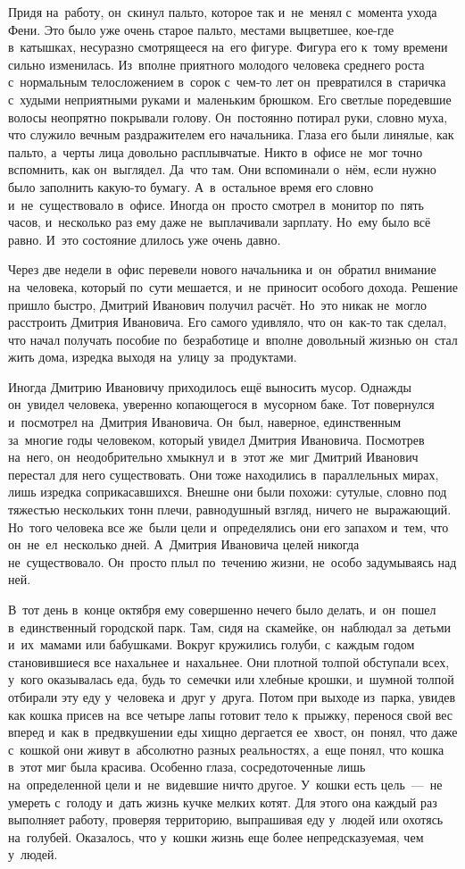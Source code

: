 Придя на~работу, он~скинул пальто, которое так и~не~менял с~момента ухода Фени.
Это было уже очень старое пальто, местами выцветшее, кое-где в~катышках, несуразно смотрящееся на~его фигуре.
Фигура его к~тому времени сильно изменилась.
Из~вполне приятного молодого человека среднего роста с~нормальным телосложением в~сорок с~чем-то лет он~превратился в~старичка с~худыми неприятными руками и~маленьким брюшком.
Его светлые поредевшие волосы неопрятно покрывали голову.
Он~постоянно потирал руки, словно муха, что служило вечным раздражителем его начальника.
Глаза его были линялые, как пальто, а~черты лица довольно расплывчатые.
Никто в~офисе не~мог точно вспомнить, как он~выглядел.
Да~что там.
Они вспоминали о~нём, если нужно было заполнить какую-то бумагу.
А~в~остальное время его словно и~не~существовало в~офисе.
Иногда он~просто смотрел в~монитор по~пять часов, и~несколько раз ему даже не~выплачивали зарплату.
Но~ему было всё равно.
И~это состояние длилось уже очень давно.
 
Через две недели в~офис перевели нового начальника и~он~обратил внимание на~человека, который по~сути мешается, и~не~приносит особого дохода.
Решение пришло быстро, Дмитрий Иванович получил расчёт.
Но~это никак не~могло расстроить Дмитрия Ивановича.
Его самого удивляло, что он~как-то так сделал, что начал получать пособие по~безработице и~вполне довольный жизнью он~стал жить дома, изредка выходя на~улицу за~продуктами.
 
Иногда Дмитрию Ивановичу приходилось ещё выносить мусор.
Однажды он~увидел человека, уверенно копающегося в~мусорном баке.
Тот повернулся и~посмотрел на~Дмитрия Ивановича.
Он~был, наверное, единственным за~многие годы человеком, который увидел Дмитрия Ивановича.
Посмотрев на~него, он~неодобрительно хмыкнул и~в~этот же~миг Дмитрий Иванович перестал для него существовать.
Они тоже находились в~параллельных мирах, лишь изредка соприкасавшихся.
Внешне они были похожи: сутулые, словно под тяжестью нескольких тонн плечи, равнодушный взгляд, ничего не~выражающий.
Но~того человека все же~были цели и~определялись они его запахом и~тем, что он~не~ел~несколько дней.
А~Дмитрия Ивановича целей никогда не~существовало.
Он~просто плыл по~течению жизни, не~особо задумываясь над ней.
 
В~тот день в~конце октября ему совершенно нечего было делать, и~он~пошел в~единственный городской парк.
Там, сидя на~скамейке, он~наблюдал за~детьми и~их~мамами или бабушками.
Вокруг кружились голуби, с~каждым годом становившиеся все нахальнее и~нахальнее.
Они плотной толпой обступали всех, у~кого оказывалась еда, будь то~семечки или хлебные крошки, и~шумной толпой отбирали эту еду у~человека и~друг у~друга.
Потом при выходе из~парка, увидев как кошка присев на~все четыре лапы готовит тело к~прыжку, перенося свой вес вперед и~как в~предвкушении еды хищно дергается ее~хвост, он~понял, что даже с~кошкой они живут в~абсолютно разных реальностях, а~еще понял, что кошка в~этот миг была красива.
Особенно глаза, сосредоточенные лишь на~определенной цели и~не~видевшие ничто другое.
У~кошки есть цель~---~не умереть с~голоду и~дать жизнь кучке мелких котят.
Для этого она каждый раз выполняет работу, проверяя территорию, выпрашивая еду у~людей или охотясь на~голубей.
Оказалось, что у~кошки жизнь еще более непредсказуемая, чем у~людей.
 
